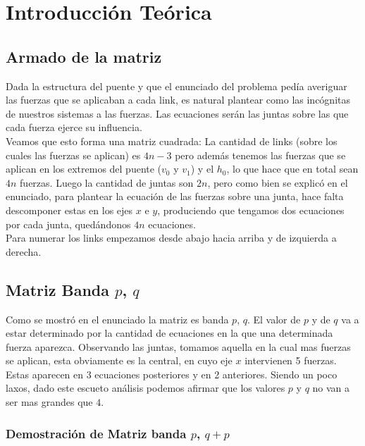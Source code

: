 \section{Introducción Teórica}

\subsection{Armado de la matriz}

Dada la estructura del puente y que el enunciado del problema pedía averiguar las fuerzas que se aplicaban a cada link, es natural plantear como las incógnitas de nuestros sistemas a las fuerzas. Las ecuaciones serán las juntas sobre las que cada fuerza ejerce su influencia.\\

Veamos que esto forma una matriz cuadrada: La cantidad de links (sobre los cuales las fuerzas se aplican) es $4n - 3$ pero además tenemos las fuerzas que se aplican en los extremos del puente ($v_0$ y $v_1$) y el $h_0$, lo que hace que en total sean $4n$ fuerzas. Luego la cantidad de juntas son $2n$, pero como bien se explicó en el enunciado, para plantear la ecuación de las fuerzas sobre una junta, hace falta descomponer estas en los ejes $x$ e $y$, produciendo que tengamos dos ecuaciones por cada junta, quedándonos $4n$ ecuaciones.\\

Para numerar los links empezamos desde abajo hacia arriba y de izquierda a derecha.

\subsection{Matriz Banda $p$, $q$}

Como se mostró en el enunciado la matriz es banda $p$, $q$. El valor de $p$ y de $q$ va a estar determinado por la cantidad de ecuaciones en la que una determinada fuerza aparezca. Observando las juntas, tomamos aquella en la cual mas fuerzas se aplican, esta obviamente es la central, en cuyo eje $x$ intervienen 5 fuerzas. Estas aparecen en 3 ecuaciones posteriores y en 2 anteriores. Siendo un poco laxos, dado este escueto análisis podemos afirmar que los valores $p$ y $q$ no van a ser mas grandes que $4$.\\

\subsubsection{Demostración de Matriz banda $p$, $q + p$}

